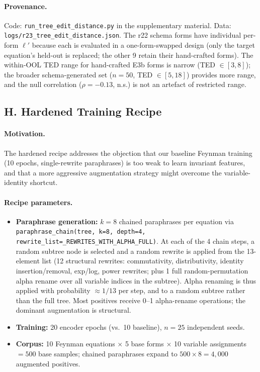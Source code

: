 \paragraph{Provenance.} Code: \texttt{run\_tree\_edit\_distance.py} in the supplementary material. Data: \texttt{logs/r23\_tree\_edit\_distance.json}. The r22 schema forms have individual per-form $\ell'$ because each is evaluated in a one-form-swapped design (only the target equation's held-out is replaced; the other 9 retain their hand-crafted forms). The within-OOL TED range for hand-crafted E3b forms is narrow (TED $\in [3, 8]$); the broader schema-generated set ($n{=}50$, TED $\in [5, 18]$) provides more range, and the null correlation ($\rho{=}{-}0.13$, n.s.) is not an artefact of restricted range.

\subsection*{H. Hardened Training Recipe}

\paragraph{Motivation.} The hardened recipe addresses the objection that our baseline Feynman training (10 epochs, single-rewrite paraphrases) is too weak to learn invariant features, and that a more aggressive augmentation strategy might overcome the variable-identity shortcut.

\paragraph{Recipe parameters.}
\begin{itemize}[nosep]
\item \textbf{Paraphrase generation:} $k{=}8$ chained paraphrases per equation via \texttt{paraphrase\_chain(tree, k=8, depth=4, rewrite\_list=\_REWRITES\_WITH\_ALPHA\_FULL)}.  At each of the 4 chain steps, a random subtree node is selected and a random rewrite is applied from the 13-element list (12 structural rewrites: commutativity, distributivity, identity insertion/removal, exp/log, power rewrites; plus 1 full random-permutation alpha rename over all variable indices in the subtree).  Alpha renaming is thus applied with probability ${\approx}1/13$ per step, and to a random subtree rather than the full tree.  Most positives receive 0--1 alpha-rename operations; the dominant augmentation is structural.
\item \textbf{Training:} 20 encoder epochs (vs.\ 10 baseline), $n{=}25$ independent seeds.
\item \textbf{Corpus:} 10 Feynman equations $\times$ 5 base forms $\times$ 10 variable assignments $= 500$ base samples; chained paraphrases expand to $500 \times 8 = 4{,}000$ augmented positives.
\end{itemize}

